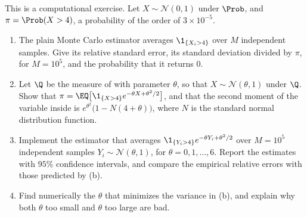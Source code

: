 \begin{exercise}\label{ex:pr-importance}
\medium This is a computational exercise. Let $X\sim\mathcal N(0,1)$ under $\Prob$, and
$\pi=\Prob(X>4)$, a probability of the order of $3\times10^{-5}$.
\begin{enumerate}[label=(\alph*)]
  \item The plain Monte Carlo estimator averages $\1_{\{X_i>4\}}$ over $M$ independent samples.
    Give its relative standard error, its standard deviation divided by $\pi$, for
    $M=10^5$, and the probability that it returns $0$.
  \item Let $\Q$ be the measure of  with parameter $\theta$, so
    that $X\sim\mathcal N(\theta,1)$ under $\Q$. Show that
    $\pi=\EQ\big[\1_{\{X>4\}}e^{-\theta X+\theta^2/2}\big]$, and that the second moment of the
    variable inside is $e^{\theta^2}\big(1-N(4+\theta)\big)$, where $N$ is the standard normal
    distribution function.
  \item Implement the estimator that averages $\1_{\{Y_i>4\}}e^{-\theta Y_i+\theta^2/2}$ over
    $M=10^5$ independent samples $Y_i\sim\mathcal N(\theta,1)$, for $\theta=0,1,\dots,6$.
    Report the estimates with $95\%$ confidence intervals, and compare the empirical relative
    errors with those predicted by (b).
  \item Find numerically the $\theta$ that minimizes the variance in (b), and explain why both
    $\theta$ too small and $\theta$ too large are bad.
\end{enumerate}
\end{exercise}
